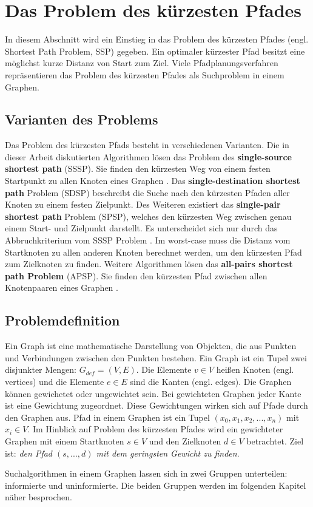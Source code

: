 \chapter{Das Problem des kürzesten Pfades}

In diesem Abschnitt wird ein Einstieg in das Problem des kürzesten Pfades (engl. Shortest Path Problem, SSP) gegeben. Ein optimaler kürzester Pfad besitzt eine möglichst kurze Distanz von Start zum Ziel\cite{Madkour.2017}. Viele Pfadplanungsverfahren repräsentieren das Problem des kürzesten Pfades als Suchproblem in einem Graphen.


\section{Varianten des Problems}

Das Problem des kürzesten Pfads besteht in verschiedenen Varianten. Die in dieser Arbeit diskutierten Algorithmen lösen das Problem des \textbf{single-source shortest path} (SSSP). Sie finden den kürzesten Weg von einem festen Startpunkt zu allen Knoten eines Graphen \cite{Gu.2018}. Das \textbf{single-destination shortest path} Problem (SDSP)  beschreibt die Suche nach den kürzesten Pfaden aller Knoten zu einem festen Zielpunkt. Des Weiteren existiert das \textbf{single-pair shortest path} Problem (SPSP), welches den kürzesten Weg zwischen genau einem Start- und Zielpunkt darstellt. Es unterscheidet sich nur durch das Abbruchkriterium vom SSSP Problem \cite{Ottmann.2017}. Im worst-case muss die Distanz vom Startknoten zu allen anderen Knoten berechnet werden, um den kürzesten Pfad zum Zielknoten zu finden. Weitere Algorithmen lösen das \textbf{all-pairs shortest path Problem} (APSP). Sie finden den kürzesten Pfad zwischen allen Knotenpaaren eines Graphen \cite{Cormen.2009}.


\section{Problemdefinition}

Ein Graph ist eine mathematische Darstellung von Objekten, die aus Punkten und Verbindungen zwischen den Punkten bestehen. Ein Graph ist ein Tupel zwei disjunkter Mengen: $G_{def}= (V,E)$. Die Elemente $v \in V$ heißen Knoten (engl. vertices) und die Elemente $e \in E$ sind die Kanten (engl. edges). Die Graphen können gewichetet oder ungewichtet sein. Bei gewichteten Graphen jeder Kante ist eine Gewichtung zugeordnet. Diese Gewichtungen wirken sich auf Pfade durch den Graphen aus\cite{Gross.2004}. Pfad in einem Graphen ist ein Tupel $\left ( x_{0}, x_{1}, x_{2}, ..., x_{n} \right )$ mit $x_{i} \in V$.  Im Hinblick auf Problem des kürzesten Pfades wird ein gewichteter Graphen mit einem Startknoten $s \in V$ und den Zielknoten $d \in V$ betrachtet. Ziel ist: \textit{den Pfad  $\left ( s, ..., d \right )$ mit dem geringsten Gewicht zu finden}\cite{Madkour.2017}. 



Suchalgorithmen in einem Graphen lassen sich in zwei Gruppen unterteilen:
informierte und uninformierte. Die beiden Gruppen werden im folgenden Kapitel
näher besprochen.